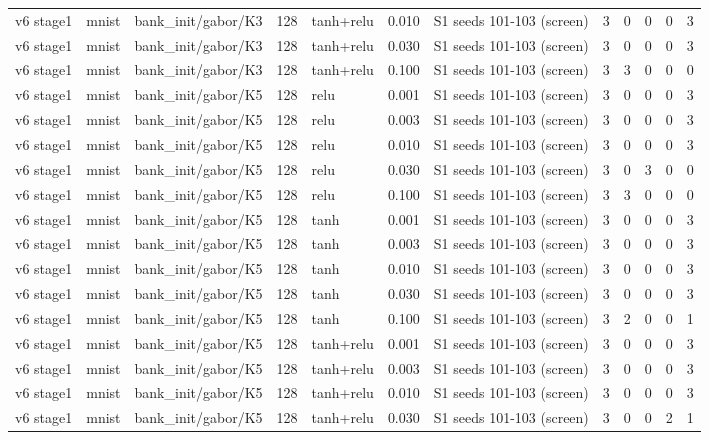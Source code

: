 \begin{table}[htbp]
{\begin{tabular}{@{}lllrlrlrrrrr@{}}
v6 stage1 & mnist & bank\_init/gabor/K3 & 128 & tanh+relu & 0.010 & S1 seeds 101-103 (screen) & 3 & 0 & 0 & 0 & 3 \\
v6 stage1 & mnist & bank\_init/gabor/K3 & 128 & tanh+relu & 0.030 & S1 seeds 101-103 (screen) & 3 & 0 & 0 & 0 & 3 \\
v6 stage1 & mnist & bank\_init/gabor/K3 & 128 & tanh+relu & 0.100 & S1 seeds 101-103 (screen) & 3 & 3 & 0 & 0 & 0 \\
v6 stage1 & mnist & bank\_init/gabor/K5 & 128 & relu & 0.001 & S1 seeds 101-103 (screen) & 3 & 0 & 0 & 0 & 3 \\
v6 stage1 & mnist & bank\_init/gabor/K5 & 128 & relu & 0.003 & S1 seeds 101-103 (screen) & 3 & 0 & 0 & 0 & 3 \\
v6 stage1 & mnist & bank\_init/gabor/K5 & 128 & relu & 0.010 & S1 seeds 101-103 (screen) & 3 & 0 & 0 & 0 & 3 \\
v6 stage1 & mnist & bank\_init/gabor/K5 & 128 & relu & 0.030 & S1 seeds 101-103 (screen) & 3 & 0 & 3 & 0 & 0 \\
v6 stage1 & mnist & bank\_init/gabor/K5 & 128 & relu & 0.100 & S1 seeds 101-103 (screen) & 3 & 3 & 0 & 0 & 0 \\
v6 stage1 & mnist & bank\_init/gabor/K5 & 128 & tanh & 0.001 & S1 seeds 101-103 (screen) & 3 & 0 & 0 & 0 & 3 \\
v6 stage1 & mnist & bank\_init/gabor/K5 & 128 & tanh & 0.003 & S1 seeds 101-103 (screen) & 3 & 0 & 0 & 0 & 3 \\
v6 stage1 & mnist & bank\_init/gabor/K5 & 128 & tanh & 0.010 & S1 seeds 101-103 (screen) & 3 & 0 & 0 & 0 & 3 \\
v6 stage1 & mnist & bank\_init/gabor/K5 & 128 & tanh & 0.030 & S1 seeds 101-103 (screen) & 3 & 0 & 0 & 0 & 3 \\
v6 stage1 & mnist & bank\_init/gabor/K5 & 128 & tanh & 0.100 & S1 seeds 101-103 (screen) & 3 & 2 & 0 & 0 & 1 \\
v6 stage1 & mnist & bank\_init/gabor/K5 & 128 & tanh+relu & 0.001 & S1 seeds 101-103 (screen) & 3 & 0 & 0 & 0 & 3 \\
v6 stage1 & mnist & bank\_init/gabor/K5 & 128 & tanh+relu & 0.003 & S1 seeds 101-103 (screen) & 3 & 0 & 0 & 0 & 3 \\
v6 stage1 & mnist & bank\_init/gabor/K5 & 128 & tanh+relu & 0.010 & S1 seeds 101-103 (screen) & 3 & 0 & 0 & 0 & 3 \\
v6 stage1 & mnist & bank\_init/gabor/K5 & 128 & tanh+relu & 0.030 & S1 seeds 101-103 (screen) & 3 & 0 & 0 & 2 & 1 \\

\end{tabular}}
\end{table}

